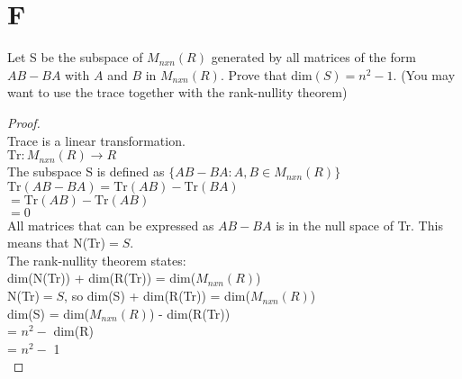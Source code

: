 \documentclass[11pt]{scrartcl}
\begin{document}
\section{F}
Let S be the subspace of $M_{nxn}(R)$ generated by all matrices of the form $AB - BA$ with $A$ and $B$ in $M_{nxn}(R)$.
Prove that dim$(S) = n^{2} - 1$. (You may want to use the trace together with the rank-nullity theorem)
\begin{proof}
	\-\\
	Trace is a linear transformation.\\
	$\text{Tr}: M_{nxn}(R) \rightarrow R $\\
	The subspace S is defined as $\{AB - BA : A,B \in M_{nxn}(R)\}$\\
	$\text{Tr}(AB - BA) = \text{Tr}(AB) - \text{Tr} (BA)$\\
	$= \text{Tr}(AB) - \text{Tr} (AB)$\\
	$= 0$\\
	All matrices that can be expressed as $AB - BA$ is in the null space of Tr. This means that N(Tr)$ = S$.\\
	The rank-nullity theorem states:\\
	dim(N(Tr)) + dim(R(Tr)) = dim($M_{nxn}(R)$)\\
	N(Tr)$ = S$, so dim(S) + dim(R(Tr)) = dim($M_{nxn}(R)$)\\
	dim(S) = dim($M_{nxn}(R)$) - dim(R(Tr))\\
	= $n^2 - $ dim(R)\\
	= $n^2 - $ 1 \\
\end{proof}
\end{document}
